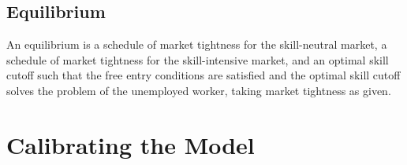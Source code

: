 \documentclass[12pt]{article}
\newcommand{\CiteReference}{../reference.bib}
\theoremstyle{definition}
\begin{document}
\subsection{Equilibrium}

An equilibrium is a schedule of market tightness for the skill-neutral market, a schedule of market tightness for the skill-intensive market, and an optimal skill cutoff such that the free entry conditions are satisfied and the optimal skill cutoff solves the problem of the unemployed worker, taking market tightness as given. 

\section{Calibrating the Model}




 
\end{document}
